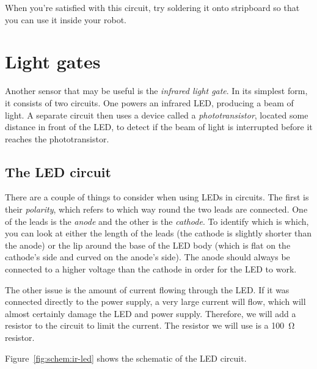 \documentclass{article}
\begin{document}

When you're satisfied with this circuit, try soldering it onto stripboard so
that you can use it inside your robot.

\newpage

\section{Light gates}


Another sensor that may be useful is the \emph{infrared light gate}. In its
simplest form, it consists of two circuits. One powers an infrared LED,
producing a beam of light. A separate circuit then uses a device called a
\emph{phototransistor}, located some distance in front of the LED, to detect if
the beam of light is interrupted before it reaches the phototransistor.

\subsection{The LED circuit}

There are a couple of things to consider when using LEDs in circuits. The first
is their \emph{polarity}, which refers to which way round the two leads are
connected. One of the leads is the \emph{anode} and the other is the
\emph{cathode}. To identify which is which, you can look at either the length of
the leads (the cathode is slightly shorter than the anode) or the lip around the
base of the LED body (which is flat on the cathode's side and curved on the
anode's side). The anode should always be connected to a higher voltage than the
cathode in order for the LED to work.

The other issue is the amount of current flowing through the LED. If it was
connected directly to the power supply, a very large current will flow, which
will almost certainly damage the LED and power supply. Therefore, we will add a
resistor to the circuit to limit the current. The resistor we will use is a
\SI{100}{\ohm} resistor.

Figure~\ref{fig:schem:ir-led} shows the schematic of the LED circuit.
\end{document}
